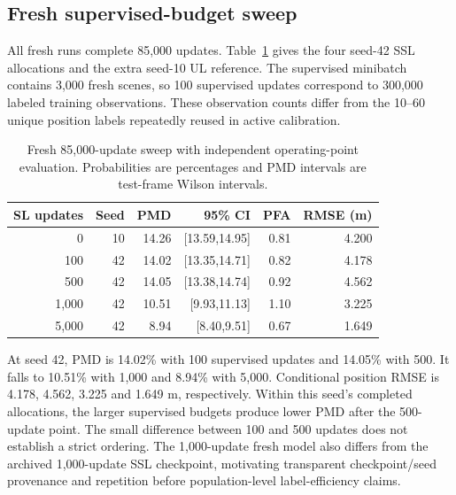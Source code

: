 \documentclass[conference]{IEEEtran}
\begin{document}
\subsection{Fresh supervised-budget sweep}
All fresh runs complete 85,000 updates. Table~\ref{tab:fractions-final} gives the four seed-42 SSL allocations and the extra seed-10 UL reference. The supervised minibatch contains 3,000 fresh scenes, so 100 supervised updates correspond to 300,000 labeled training observations. These observation counts differ from the 10--60 unique position labels repeatedly reused in active calibration.
\begin{table}[t]\centering\small
\caption{Fresh 85,000-update sweep with independent operating-point evaluation. Probabilities are percentages and PMD intervals are test-frame Wilson intervals.}\label{tab:fractions-final}
\setlength{\tabcolsep}{3pt}
\begin{tabular}{rrrrrr}\toprule
SL updates & Seed & PMD & 95\% CI & PFA & RMSE (m)\\\midrule
0 & 10 & 14.26 & [13.59,14.95] & 0.81 & 4.200\\
100 & 42 & 14.02 & [13.35,14.71] & 0.82 & 4.178\\
500 & 42 & 14.05 & [13.38,14.74] & 0.92 & 4.562\\
1,000 & 42 & 10.51 & [9.93,11.13] & 1.10 & 3.225\\
5,000 & 42 & 8.94 & [8.40,9.51] & 0.67 & 1.649\\
\bottomrule\end{tabular}
\end{table}
At seed 42, PMD is 14.02\% with 100 supervised updates and 14.05\% with 500. It falls to 10.51\% with 1,000 and 8.94\% with 5,000. Conditional position RMSE is 4.178, 4.562, 3.225 and 1.649 m, respectively. Within this seed's completed allocations, the larger supervised budgets produce lower PMD after the 500-update point. The small difference between 100 and 500 updates does not establish a strict ordering. The 1,000-update fresh model also differs from the archived 1,000-update SSL checkpoint, motivating transparent checkpoint/seed provenance and repetition before population-level label-efficiency claims.
\end{document}
